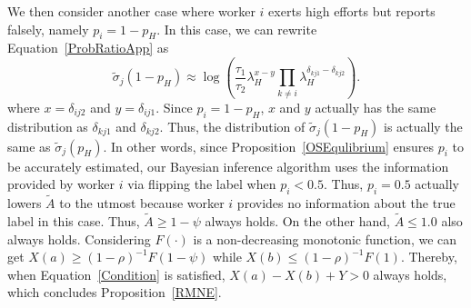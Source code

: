 \documentclass{article}
\begin{document}
We then consider another case where worker $i$ exerts high efforts but reports falsely, namely $p_i=1-p_H$. In this case, we can rewrite Equation~\ref{ProbRatioApp} as
\begin{equation}
\tilde{\sigma}_j(1-p_H)\approx \log\left(\frac{\tau_{1}}{\tau_{2}}\lambda_H^{x-y}{\prod}_{k\neq i}\lambda_H^{\delta_{kj1}-\delta_{kj2}}\right).
\end{equation}
where $x=\delta_{ij2}$ and $y=\delta_{ij1}$. Since $p_i=1-p_H$, $x$ and $y$ actually has the same distribution as $\delta_{kj1}$ and $\delta_{kj2}$. Thus, the distribution of $\tilde{\sigma}_j(1-p_H)$ is actually the same as $\tilde{\sigma}_j(p_H)$.
In other words, since Proposition~\ref{OSEqulibrium} ensures $p_i$ to be accurately estimated, our Bayesian inference algorithm uses the information provided by worker $i$ via flipping the label when $p_i<0.5$.
Thus, $p_i=0.5$ actually lowers $\tilde{A}$ to the utmost because worker $i$ provides no information about the true label in this case.
Thus, $\tilde{A}\geq 1-\psi$ always holds.
On the other hand, $\tilde{A}\leq 1.0$ also always holds.
Considering $F(\cdot)$ is a non-decreasing monotonic function, we can get $X(a)\geq (1-\rho)^{-1}F(1-\psi)$ while $X(b) \leq (1-\rho)^{-1}F(1)$.
Thereby, when Equation~\ref{Condition} is satisfied, $X(a)-X(b)+Y>0$ always holds, which concludes Proposition~\ref{RMNE}.
%
%

\end{document}
